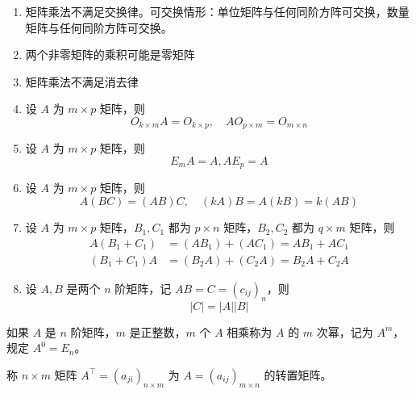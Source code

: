\documentclass{ctexbook}
\begin{document}
\begin{proposition}[矩阵乘法性质]
    \begin{enumerate}
        \item 矩阵乘法不满足交换律。可交换情形：单位矩阵与任何同阶方阵可交换，数量矩阵与任何同阶方阵可交换。
        \item 两个非零矩阵的乘积可能是零矩阵
        \item 矩阵乘法不满足消去律
        \item 设 $A$ 为 $m\times p$ 矩阵，则
        \begin{equation}
            O_{k\times m}A=O_{k\times p},\quad AO_{p\times m}=O_{m\times n}
        \end{equation}
        \item 设 $A$ 为 $m\times p$ 矩阵，则
        \begin{equation}
            E_m A=A, A E_p =A
        \end{equation}
        \item 设 $A$ 为 $m\times p$ 矩阵，则
        \begin{equation}
            A(BC)=(AB)C,\quad (kA)B=A(kB)=k(AB)
        \end{equation}
        \item 设 $A$ 为 $m\times p$ 矩阵，$B_1,C_1$ 都为 $p\times n$ 矩阵，$B_2,C_2$ 都为 $q\times m$ 矩阵，则
        \begin{equation}
            \begin{aligned}            
                A(B_1+C_1)&=(AB_1)+(AC_1)=AB_1+AC_1\\
                (B_1+C_1)A&=(B_2A)+(C_2A)=B_2A+C_2A
            \end{aligned}
        \end{equation}
        \item 设 $A,B$ 是两个 $n$ 阶矩阵，记 $AB=C=(c_{ij})_n$，则
        \begin{equation}
            |C|=|A||B|
        \end{equation}
    \end{enumerate}
\end{proposition}

\begin{definition}[方阵的幂]
    如果 $A$ 是 $n$ 阶矩阵，$m$ 是正整数，$m$ 个 $A$ 相乘称为 $A$ 的 $m$ 次幂，记为 $A^m$，规定 $A^0=E_n$。
\end{definition}

\begin{definition}[矩阵转置]
    称 $n\times m$ 矩阵 $A^\top=(a_{ji})_{n\times m}$ 为 $A=(a_{ij})_{m\times n}$ 的转置矩阵。
\end{definition}
\end{document}
